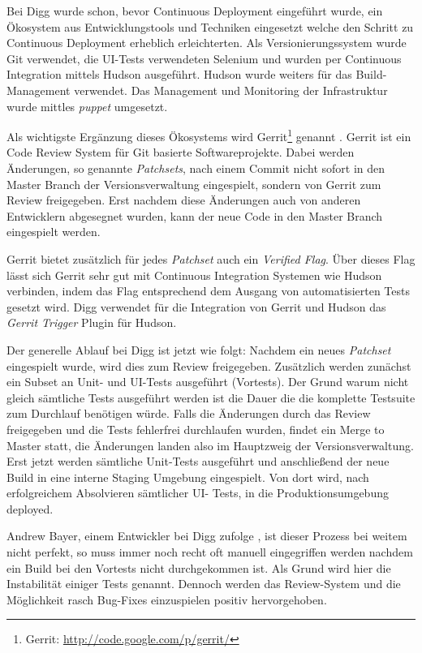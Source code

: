  Bei Digg wurde schon, bevor Continuous Deployment
eingeführt wurde, ein Ökosystem aus Entwicklungstools und Techniken eingesetzt
welche den Schritt zu Continuous Deployment erheblich erleichterten. Als
Versionierungssystem wurde Git verwendet, die UI-Tests verwendeten Selenium
und wurden per Continuous Integration mittels Hudson ausgeführt. Hudson wurde
weiters für das Build-Management verwendet. Das Management und Monitoring der
Infrastruktur wurde mittles \emph{puppet} umgesetzt.

Als wichtigste Ergänzung dieses Ökosystems wird Gerrit\footnote{Gerrit:
\url{http://code.google.com/p/gerrit/}} genannt \cite{digg4}. Gerrit ist ein
Code Review System für Git basierte Softwareprojekte. Dabei werden Änderungen,
so genannte \emph{Patchsets}, nach einem Commit nicht sofort in den Master
Branch der Versionsverwaltung eingespielt, sondern von Gerrit zum Review
freigegeben. Erst nachdem diese Änderungen auch von anderen Entwicklern
abgesegnet wurden, kann der neue Code in den Master Branch eingespielt werden.

Gerrit bietet zusätzlich für jedes \emph{Patchset} auch ein \emph{Verified
Flag}. Über dieses Flag lässt sich Gerrit sehr gut mit Continuous Integration
Systemen wie Hudson verbinden, indem das Flag entsprechend dem Ausgang von
automatisierten Tests gesetzt wird. Digg verwendet für die Integration von
Gerrit und Hudson das \emph{Gerrit Trigger} Plugin für Hudson.

Der generelle Ablauf bei Digg ist jetzt wie folgt: Nachdem ein neues
\emph{Patchset} eingespielt wurde, wird dies zum Review freigegeben.
Zusätzlich werden zunächst ein Subset an Unit- und UI-Tests ausgeführt
(Vortests). Der Grund warum nicht gleich sämtliche Tests ausgeführt werden ist
die Dauer die die komplette Testsuite zum Durchlauf benötigen würde. Falls die
Änderungen durch das Review freigegeben und die Tests fehlerfrei durchlaufen
wurden, findet ein Merge to Master statt, die Änderungen landen also im
Hauptzweig der Versionsverwaltung. Erst jetzt werden sämtliche Unit-Tests
ausgeführt und anschließend der neue Build in eine interne Staging Umgebung
eingespielt. Von dort wird, nach erfolgreichem Absolvieren sämtlicher UI-
Tests, in die Produktionsumgebung deployed.

Andrew Bayer, einem Entwickler bei Digg zufolge \cite{digg4}, ist dieser
Prozess bei weitem nicht perfekt, so muss immer noch recht oft manuell
eingegriffen werden nachdem ein Build bei den Vortests nicht durchgekommen
ist. Als Grund wird hier die Instabilität einiger Tests genannt. Dennoch
werden das Review-System und die Möglichkeit rasch Bug-Fixes einzuspielen
positiv hervorgehoben.


